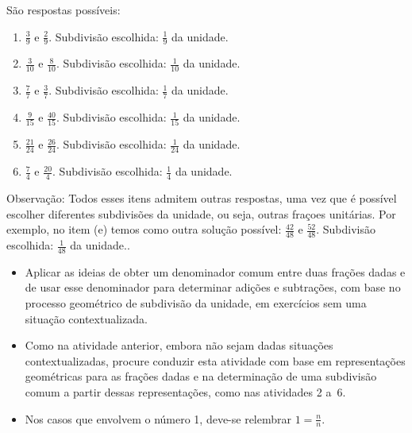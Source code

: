 \begin{multicols}{2}
\begin{solucao}{}{}
  São respostas possíveis:
\begin{enumerate} [\quad a)] %
    \item             $\frac{3}{9}$       e       $\frac{2}{9}$.        Subdivisão escolhida:       $\frac{1}{9}$       da unidade.
    \item             $\frac{3}{10}$       e       $\frac{8}{10}$.      Subdivisão escolhida:       $\frac{1}{10}$       da unidade.
    \item             $\frac{7}{7}$       e       $\frac{3}{7}$.        Subdivisão escolhida:       $\frac{1}{7}$       da unidade.
    \item             $\frac{9}{15}$       e       $\frac{40}{15}$.   Subdivisão escolhida:       $\frac{1}{15}$       da unidade.
    \item             $\frac{21}{24}$       e       $\frac{26}{24}$.    Subdivisão escolhida:       $\frac{1}{24}$       da unidade.
    \item             $\frac{7}{4}$       e       $\frac{20}{4}$.       Subdivisão escolhida:       $\frac{1}{4}$       da unidade.
\end{enumerate} %


  Observação: Todos esses itens admitem outras respostas, uma vez que é possível escolher diferentes subdivisões da unidade, ou seja, outras fraçoes unitárias. Por exemplo, no item (e) temos como outra solução possível:   $\frac{42}{48}$   e   $\frac{52}{48}$. Subdivisão escolhida:   $\frac{1}{48}$   da unidade..
\end{solucao}



\begin{objetivos}[label=chap5-ativ8]{}{}



  \begin{itemize} %
    \item       Aplicar as ideias de obter um denominador comum entre duas frações dadas e de usar esse denominador para determinar adições e subtrações, com base no processo geométrico de subdivisão da unidade, em exercícios sem uma situação contextualizada.
  \end{itemize} %
\end{objetivos}

\begin{orientacoes}{}{}

  \begin{itemize} %
    \item       Como na atividade anterior, embora não sejam dadas situações contextualizadas, procure conduzir esta atividade com base em representações geométricas para as frações dadas e na determinação de uma subdivisão comum a partir dessas representações, como nas atividades 2 a~6.
    \item  Nos casos que envolvem o número 1, deve-se relembrar   $1 = \frac{n}{n}$.
  \end{itemize} %
\end{orientacoes}



\end{multicols}
